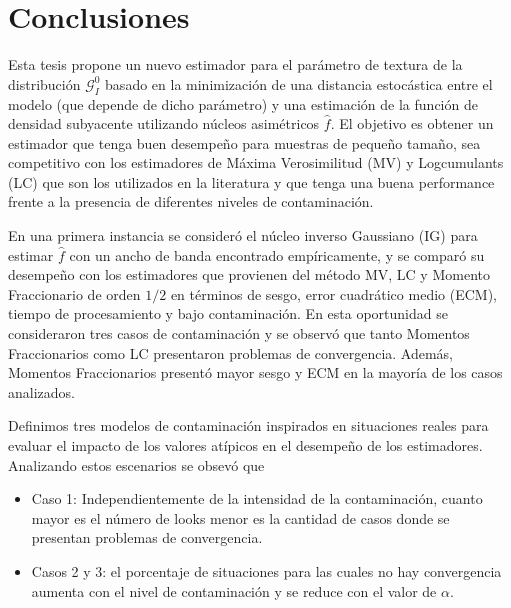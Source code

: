 
\chapter{Conclusiones}
\label{Conclusiones}

Esta tesis propone un nuevo estimador para el parámetro de textura de la distribución $\mathcal{G}_I^0$ basado en la minimización de una distancia estocástica entre el modelo (que depende de dicho parámetro) y una estimación de la función de densidad subyacente utilizando núcleos asimétricos $\widehat{f}$. El objetivo es obtener un estimador que tenga buen desempeño para muestras de pequeño tamaño, sea competitivo con los estimadores de Máxima Verosimilitud (MV) y Logcumulants (LC) que son los utilizados en la literatura y que tenga una buena performance frente a la presencia de diferentes niveles de contaminación.



En una primera instancia se consideró el núcleo inverso Gaussiano (IG) para estimar $\widehat{f}$ con un ancho de banda encontrado empíricamente, y se comparó su desempeño con los estimadores que provienen del método MV, LC y Momento Fraccionario de orden $1/2$ en términos de sesgo, error cuadrático medio (ECM), tiempo de procesamiento y bajo contaminación. En esta oportunidad se consideraron tres casos de contaminación y se observó que tanto Momentos Fraccionarios como LC presentaron problemas de convergencia. Además, Momentos Fraccionarios presentó mayor sesgo y ECM en la mayoría de los casos analizados.

Definimos tres modelos de contaminación inspirados en situaciones reales para evaluar el impacto de los valores atípicos en el desempeño de los estimadores. Analizando estos escenarios se obsevó que

\begin{itemize}
	\item Caso 1: Independientemente de la intensidad de la contaminación, cuanto mayor es el número de looks menor es la cantidad de casos donde se presentan problemas de convergencia. 
	\item  Casos 2 y 3: el porcentaje de situaciones para las cuales no hay convergencia aumenta con el nivel de contaminación y se reduce con el valor de $\alpha$.
\end{itemize}

